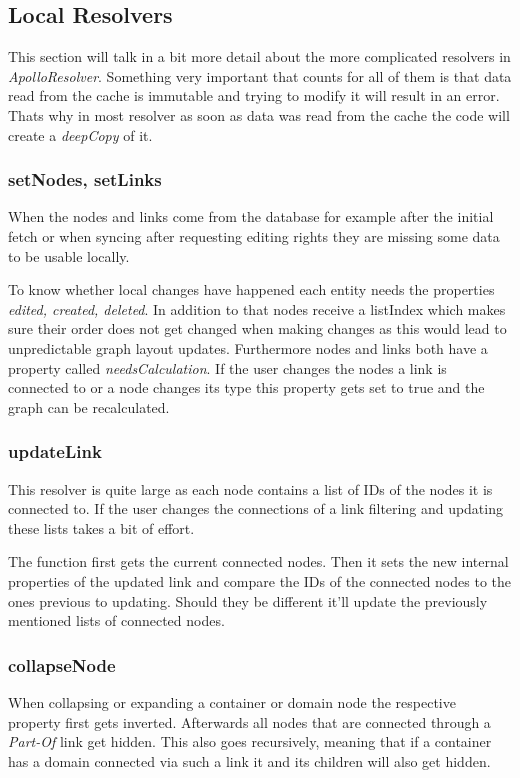 \subsection{Local Resolvers}
This section will talk in a bit more detail about the more complicated resolvers in \emph{ApolloResolver}. Something very important that counts for all of them is that data read from the cache is immutable and trying to modify it will result in an error. Thats why in most resolver as soon as data was read from the cache the code will create a \emph{deepCopy} of it.

\subsubsection{setNodes, setLinks}
When the nodes and links come from the database for example after the initial fetch or when syncing after requesting editing rights they are missing some data to be usable locally.

To know whether local changes have happened each entity needs the properties \emph{edited, created, deleted}. In addition to that nodes receive a listIndex which makes sure their order does not get changed when making changes as this would lead to unpredictable graph layout updates. Furthermore nodes and links both have a property called \emph{needsCalculation}. If the user changes the nodes a link is connected to or a node changes its type this property gets set to true and the graph can be recalculated.

\subsubsection{updateLink}
This resolver is quite large as each node contains a list of IDs of the nodes it is connected to. If the user changes the connections of a link filtering and updating these lists takes a bit of effort.

The function first gets the current connected nodes. Then it sets the new internal properties of the updated link and compare the IDs of the connected nodes to the ones previous to updating. Should they be different it'll update the previously mentioned lists of connected nodes.

\subsubsection{collapseNode}
When collapsing or expanding a container or domain node the respective property first gets inverted. Afterwards all nodes that are connected through a \emph{Part-Of} link get hidden. This also goes recursively, meaning that if a container has a domain connected via such a link it and its children will also get hidden.

